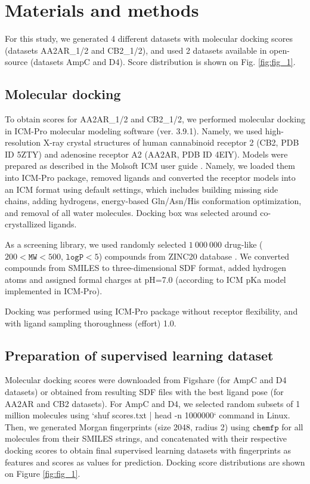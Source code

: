 \section{Materials and methods}
For this study, we generated 4 different datasets with molecular docking scores (datasets AA2AR\_1/2 and CB2\_1/2), and used 2 datasets available in open-source \cite{ultralarge_docking_first} (datasets AmpC and D4). Score distribution is shown on Fig. \ref{fig:fig_1}.

\subsection{Molecular docking}
To obtain scores for AA2AR\_1/2 and CB2\_1/2, we performed molecular docking in ICM-Pro molecular modeling software (ver. 3.9.1). Namely, we used high-resolution X-ray crystal structures of human cannabinoid receptor 2 (CB2, PDB ID 5ZTY) and adenosine receptor A2 (AA2AR, PDB ID 4EIY). Models were prepared as described in the Molsoft ICM user guide \cite{molsoft_guide}. Namely, we loaded them into ICM-Pro package, removed ligands and converted the receptor models into an ICM format using default settings, which includes building missing side chains, adding hydrogens, energy-based Gln/Asn/His conformation optimization, and removal of all water molecules. Docking box was selected around co-crystallized ligands.

As a screening library, we used randomly selected $1\ 000\ 000$ drug-like ($200 < \texttt{MW} < 500$, $\texttt{logP} < 5$) compounds from ZINC20 database \cite{Irwin2020ZINC20Discovery} . We converted compounds from SMILES to three-dimensional SDF  format, added hydrogen atoms and assigned formal charges at pH=7.0 (according to ICM pKa model implemented in ICM-Pro).

Docking was performed using ICM-Pro package without receptor flexibility, and with ligand sampling thoroughness (effort) 1.0.

\subsection{Preparation of supervised learning dataset}
Molecular docking scores were downloaded from Figshare (for AmpC and D4 datasets) or obtained from resulting SDF files with the best ligand pose (for AA2AR and CB2 datasets). For AmpC and D4, we selected random subsets of 1 million molecules using `shuf scores.txt | head -n 1000000` command in Linux. Then, we generated Morgan fingerprints (size 2048, radius 2) using $\texttt{chemfp}$ \cite{Dalke2019} for all molecules from their SMILES strings, and concatenated with their respective docking scores to obtain final supervised learning datasets with fingerprints as features and scores as values for prediction. Docking score distributions are shown on Figure \ref{fig:fig_1}.


